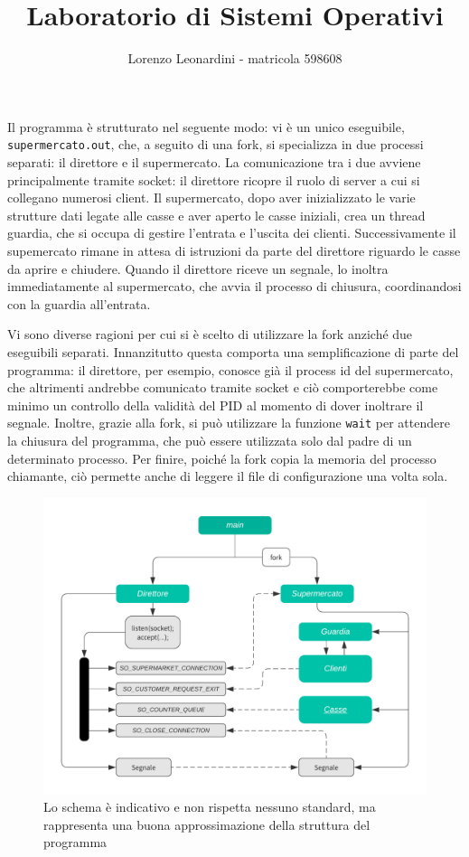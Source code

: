 \documentclass[a4paper,11pt] {article}
\title{\textbf{Laboratorio di Sistemi Operativi}}
\author{Lorenzo Leonardini - matricola 598608}
\date{}
\begin{document}
\maketitle

Il programma è strutturato nel seguente modo: vi è un unico eseguibile, \lstinline{supermercato.out}, che, a seguito di una fork, si specializza in due processi separati: il direttore e il supermercato. La comunicazione tra i due avviene principalmente tramite socket: il direttore ricopre il ruolo di server a cui si collegano numerosi client. Il supermercato, dopo aver inizializzato le varie strutture dati legate alle casse e aver aperto le casse iniziali, crea un thread guardia, che si occupa di gestire l'entrata e l'uscita dei clienti. Successivamente il supemercato rimane in attesa di istruzioni da parte del direttore riguardo le casse da aprire e chiudere. Quando il direttore riceve un segnale, lo inoltra immediatamente al supermercato, che avvia il processo di chiusura, coordinandosi con la guardia all'entrata.

Vi sono diverse ragioni per cui si è scelto di utilizzare la fork anziché due eseguibili separati. Innanzitutto questa comporta una semplificazione di parte del programma: il direttore, per esempio, conosce già il process id del supermercato, che altrimenti andrebbe comunicato tramite socket e ciò comporterebbe come minimo un controllo della validità del PID al momento di dover inoltrare il segnale. Inoltre, grazie alla fork, si può utilizzare la funzione \lstinline{wait} per attendere la chiusura del programma, che può essere utilizzata solo dal padre di un determinato processo. Per finire, poiché la fork copia la memoria del processo chiamante, ciò permette anche di leggere il file di configurazione una volta sola.

\begin{figure}[!h]
	\begin{center}
		\includegraphics[width=.8\textwidth]{chart}
		\caption{\small Lo schema è indicativo e non rispetta nessuno standard, ma rappresenta una buona approssimazione della struttura del programma}
	\end{center}
\end{figure}
\end{document}
